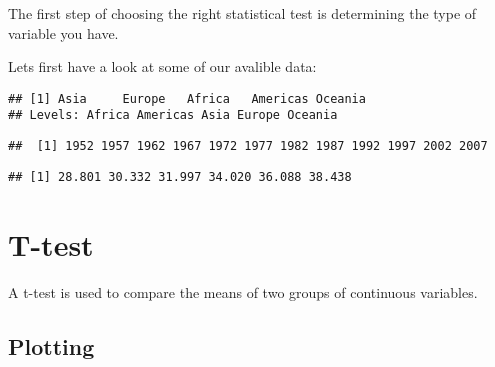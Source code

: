 \documentclass[]{book}
\makeatletter
\newenvironment{Shaded}{\begin{snugshade}}{\end{snugshade}}
\newcommand{\KeywordTok}[1]{\textcolor[rgb]{0.13,0.29,0.53}{\textbf{#1}}}
\newcommand{\StringTok}[1]{\textcolor[rgb]{0.31,0.60,0.02}{#1}}
\newcommand{\CommentTok}[1]{\textcolor[rgb]{0.56,0.35,0.01}{\textit{#1}}}
\newcommand{\OperatorTok}[1]{\textcolor[rgb]{0.81,0.36,0.00}{\textbf{#1}}}
\newcommand{\NormalTok}[1]{#1}
\newenvironment{kframe}{%
\medskip{}
\setlength{\fboxsep}{.8em}
 \def\at@end@of@kframe{}%
 \ifinner\ifhmode%
  \def\at@end@of@kframe{\end{minipage}}%
  \begin{minipage}{\columnwidth}%
 \fi\fi%
 \def\FrameCommand##1{\hskip\@totalleftmargin \hskip-\fboxsep
 \colorbox{shadecolor}{##1}\hskip-\fboxsep
     \hskip-\linewidth \hskip-\@totalleftmargin \hskip\columnwidth}%
 \MakeFramed {\advance\hsize-\width
   \@totalleftmargin\z@ \linewidth\hsize
   \@setminipage}}%
 {\par\unskip\endMakeFramed%
 \at@end@of@kframe}
\renewenvironment{Shaded}{\begin{kframe}}{\end{kframe}}
\theoremstyle{definition}
\theoremstyle{definition}
\theoremstyle{definition}
\theoremstyle{remark}
\makeatother
\begin{document}
The first step of choosing the right statistical test is determining the
type of variable you have.

Lets first have a look at some of our avalible data:

\begin{Shaded}
\end{Shaded}

\begin{verbatim}
## [1] Asia     Europe   Africa   Americas Oceania 
## Levels: Africa Americas Asia Europe Oceania
\end{verbatim}

\begin{Shaded}
\end{Shaded}

\begin{verbatim}
##  [1] 1952 1957 1962 1967 1972 1977 1982 1987 1992 1997 2002 2007
\end{verbatim}

\begin{Shaded}
\end{Shaded}

\begin{verbatim}
## [1] 28.801 30.332 31.997 34.020 36.088 38.438
\end{verbatim}

\section{T-test}\label{t-test}

A t-test is used to compare the means of two groups of continuous
variables.

\subsection{Plotting}\label{plotting}
\end{document}
